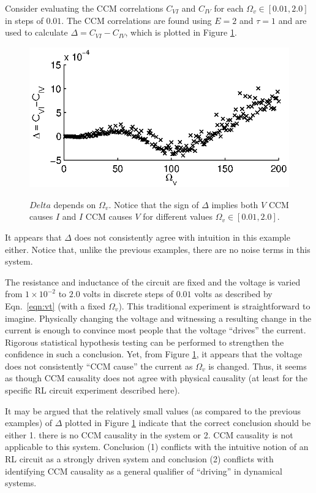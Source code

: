 \documentclass[twocolumn,aps,pre,groupedaddress]{revtex4-1}
\begin{document}
Consider evaluating the CCM correlations $C_{VI}$ and $C_{IV}$ for each $\Omega_v\in[0.01,2.0]$ in steps of $0.01$.  The CCM correlations are found using $E=2$ and $\tau=1$ and are used to calculate $\Delta = C_{VI}-C_{IV}$, which is plotted in Figure \ref{fig:Av}.
\begin{figure}[ht]
\includegraphics[scale=0.9]{RLCircuitVaryV_Freq.eps} \\
\caption{$Delta$ depends on $\Omega_v$.  Notice that the sign of $\Delta$ implies both $V$ CCM causes $I$ and $I$ CCM causes $V$ for different values $\Omega_v\in[0.01,2.0]$.}
\label{fig:Av}
\end{figure}
It appears that $\Delta$ does not consistently agree with intuition in this example either.  Notice that, unlike the previous examples, there are no noise terms in this system.  

The resistance and inductance of the circuit are fixed and the voltage is varied from $1\times 10^{-2}$ to $2.0$ volts in discrete steps of $0.01$ volts as described by Eqn.\ \ref{eqn:vt} (with a fixed $\Omega_v$).  This traditional experiment is straightforward to imagine.  Physically changing the voltage and witnessing a resulting change in the current is enough to convince most people that the voltage ``drives'' the current.  Rigorous statistical hypothesis testing can be performed to strengthen the confidence in such a conclusion.  Yet, from Figure \ref{fig:Av}, it appears that the voltage does not consistently ``CCM cause'' the current as $\Omega_v$ is changed.  Thus, it seems as though CCM causality does not agree with physical causality (at least for the specific RL circuit experiment described here).

It may be argued that the relatively small values (as compared to the previous examples) of $\Delta$ plotted in Figure \ref{fig:Av} indicate that the correct conclusion should be either 1. there is no CCM causality in the system or 2. CCM causality is not applicable to this system.  Conclusion (1) conflicts with the intuitive notion of an RL circuit as a strongly driven system and conclusion (2) conflicts with identifying CCM causality as a general qualifier of ``driving'' in dynamical systems.
\end{document}
